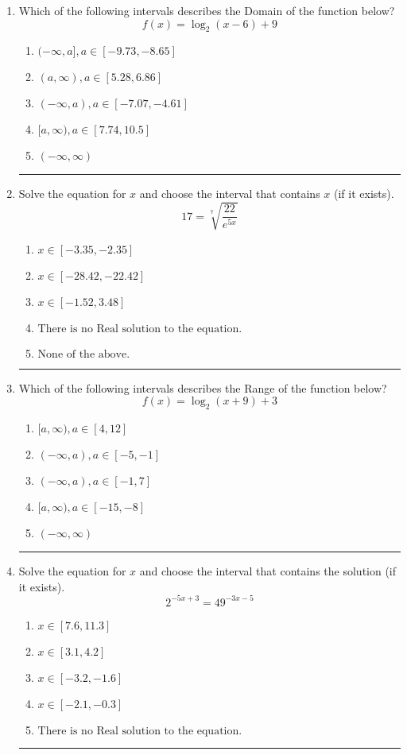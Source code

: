 \documentclass[14pt]{extbook}
\newcommand{\litem}[1]{\item#1\hspace*{-1cm}\rule{\textwidth}{0.4pt}}
\begin{document}
\begin{enumerate}
{\begin{enumerate}[label=\Alph*.]
\end{enumerate} }
\litem{
Which of the following intervals describes the Domain of the function below?\[ f(x) = \log_2{(x-6)}+9 \]\begin{enumerate}[label=\Alph*.]
\item \( (-\infty, a], a \in [-9.73, -8.65] \)
\item \( (a, \infty), a \in [5.28, 6.86] \)
\item \( (-\infty, a), a \in [-7.07, -4.61] \)
\item \( [a, \infty), a \in [7.74, 10.5] \)
\item \( (-\infty, \infty) \)

\end{enumerate} }
\litem{
 Solve the equation for $x$ and choose the interval that contains $x$ (if it exists).\[  17 = \sqrt[7]{\frac{22}{e^{5x}}} \]\begin{enumerate}[label=\Alph*.]
\item \( x \in [-3.35, -2.35] \)
\item \( x \in [-28.42, -22.42] \)
\item \( x \in [-1.52, 3.48] \)
\item \( \text{There is no Real solution to the equation.} \)
\item \( \text{None of the above.} \)

\end{enumerate} }
\litem{
Which of the following intervals describes the Range of the function below?\[ f(x) = \log_2{(x+9)}+3 \]\begin{enumerate}[label=\Alph*.]
\item \( [a, \infty), a \in [4, 12] \)
\item \( (-\infty, a), a \in [-5, -1] \)
\item \( (-\infty, a), a \in [-1, 7] \)
\item \( [a, \infty), a \in [-15, -8] \)
\item \( (-\infty, \infty) \)

\end{enumerate} }
\litem{
Solve the equation for $x$ and choose the interval that contains the solution (if it exists).\[ 2^{-5x+3} = 49^{-3x-5} \]\begin{enumerate}[label=\Alph*.]
\item \( x \in [7.6, 11.3] \)
\item \( x \in [3.1, 4.2] \)
\item \( x \in [-3.2, -1.6] \)
\item \( x \in [-2.1, -0.3] \)
\item \( \text{There is no Real solution to the equation.} \)


\end{enumerate}}
\end{enumerate}
\end{document}
